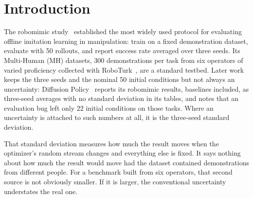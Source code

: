 \IfFileExists{IEEEtran.cls}{\documentclass[journal]{IEEEtran}}{\documentclass[10pt,twocolumn]{article}}
\newcommand{\IEEEPARstart}[2]{#1#2}
\begin{document}
\section{Introduction}
\IEEEPARstart{T}{he} robomimic study~\cite{mandlekar2021robomimic} established the most widely used protocol for evaluating offline imitation learning in manipulation: train on a fixed demonstration dataset, evaluate with 50 rollouts, and report success rate averaged over three seeds. Its Multi-Human (MH) datasets, 300 demonstrations per task from six operators of varied proficiency collected with RoboTurk~\cite{mandlekar2018roboturk}, are a standard testbed. Later work keeps the three seeds and the nominal 50 initial conditions but not always an uncertainty: Diffusion Policy~\cite{chi2023diffusion} reports its robomimic results, baselines included, as three-seed averages with no standard deviation in its tables, and notes that an evaluation bug left only 22 initial conditions on those tasks. Where an uncertainty is attached to such numbers at all, it is the three-seed standard deviation.

That standard deviation measures how much the result moves when the optimizer's random stream changes and everything else is fixed. It says nothing about how much the result would move had the dataset contained demonstrations from different people. For a benchmark built from six operators, that second source is not obviously smaller. If it is larger, the conventional uncertainty understates the real one.
\end{document}
